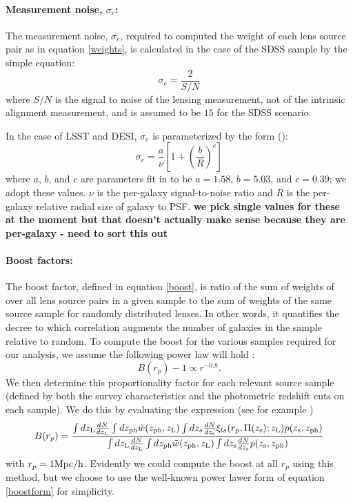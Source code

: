 \documentclass[a4paper,fleqn,usenatbib]{mnras}
\begin{document}
\paragraph*{Measurement noise, $\sigma_e$:} The measurement noise, $\sigma_e$, required to computed the weight of each lens source pair as in equation \ref{weights}, is calculated in the case of the SDSS sample by the simple equation:
\begin{equation}
\sigma_e = \frac{2}{S/N}
\label{sigeSDSS}
\end{equation}
where $S/N$ is the signal to noise of the lensing measurement, not of the intrinsic alignment measurement, and is assumed to be $15$ for the SDSS scenario.

In the case of LSST and DESI, $\sigma_e$ is parameterized by the form (\cite{Chang2013}):
\begin{equation}
\sigma_e = \frac{a}{\nu}\left[1 + \left(\frac{b}{R}\right)^c\right]
\label{sigeLSST}
\end{equation}
where $a$, $b$, and $c$ are parameters fit in \cite{Chang2013} to be $a=1.58$, $b=5.03$, and $c=0.39$; we adopt these values. $\nu$ is the per-galaxy signal-to-noise ratio and $R$ is the per-galaxy relative radial size of galaxy to PSF. {\bf we pick single values for these at the moment but that doesn't actually make sense because they are per-galaxy - need to sort this out}
\paragraph*{Boost factors:} The boost factor, defined in equation \ref{boost}, is ratio of the sum of weights of over all lens source pairs in a given sample to the sum of weights of the same source sample for randomly distributed lenses. In other words, it quantifies the decree to which correlation augments the number of galaxies in the sample relative to random. To compute the boost for the various samples required for our analysis, we assume the following power law will hold \cite{xx}:
\begin{equation}
B(r_p) - 1 \propto r^{-0.8}.
\label{boostform}
\end{equation}
We then determine this proportionality factor for each relevant source sample (defined by both the survey characteristics and the photometric redshift cuts on each sample). We do this by evaluating the expression (see for example \cite{Blazek2012})
\begin{equation}
B(r_p) = \frac{\int dz_{\rm L} \frac{dN}{dz_{\rm L}} \int dz_{\rm ph} \tilde{w}(z_{\rm ph}, z_{\rm L}) \int dz_s \frac{dN}{dz_{\rm s}} \xi_{ls}(r_p, \Pi(z_{\rm s}); z_{\rm L}) p(z_{\rm s}, z_{\rm ph})}{\int dz_{\rm L} \frac{dN}{dz_{\rm L}} \int dz_{\rm ph} \tilde{w}(z_{\rm ph}, z_{\rm L}) \int dz_{\rm s} \frac{dN}{dz_{\rm s}}p(z_{\rm s}, z_{\rm ph})}
\label{boost}
\end{equation} 
with $r_p=1 {\rm Mpc}/{\rm h}$. Evidently we could compute the boost at all $r_p$ using this method, but we choose to use the well-known power lawer form of equation \ref{boostform} for simplicity.
\end{document}
